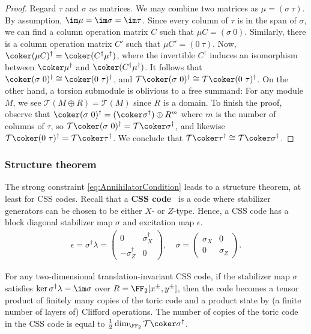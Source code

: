 \begin{proof}
Regard $\tau$ and $\sigma$ as matrices.
We may combine two matrices as $\mu = (\sigma~\tau)$.
By assumption, $\im \mu = \im \sigma = \im \tau$.
Since every column of $\tau$ is in the span of $\sigma$,
we can find a column operation matrix $C$ such that
$\mu C = (\sigma ~ 0)$.
Similarly, there is a column operation matrix $C'$ such that
$\mu C' = (0~\tau)$.
Now, $\coker (\mu C)^\dagger = \coker (C^\dagger \mu^\dagger)$,
where the invertible $C^\dagger$ induces an isomorphism between
$\coker \mu^\dagger$ and $\coker (C^\dagger \mu^\dagger)$.
It follows that $\coker (\sigma~0)^\dagger \cong \coker (0~\tau)^\dagger$,
and $\mathcal T \coker (\sigma~0)^\dagger \cong \mathcal T \coker (0~\tau)^\dagger$.
On the other hand,
a torsion submodule is oblivious to a free summand:
For any module $M$, we see $\mathcal T(M \oplus R) = \mathcal T(M)$
since $R$ is a domain.
To finish the proof, observe that 
$\coker (\sigma~0)^\dagger = (\coker \sigma^\dagger) \oplus R^m$
where $m$ is the number of columns of $\tau$,
so $\mathcal T \coker (\sigma~0)^\dagger = \mathcal T \coker \sigma^\dagger$,
and likewise $\mathcal T \coker (0~\tau)^\dagger = \mathcal T \coker \tau^\dagger$.
We conclude that $\mathcal T \coker \tau^\dagger \cong \mathcal T \coker \sigma^\dagger$.
\end{proof}

\subsubsection{Structure theorem}

The strong constraint \eqref{eq:AnnihilatorCondition}
leads to a structure theorem, at least for CSS codes.
Recall that a {\bf CSS code}~\cite{CalderbankShor1996Good,Steane1996Multiple}
is a code where stabilizer generators
can be chosen to be either $X$- or $Z$-type.
Hence, a CSS code has a block diagonal stabilizer map $\sigma$
and excitation map $\epsilon$.
\begin{align}
\epsilon = \sigma^\dagger \lambda = \begin{pmatrix}
0 & \sigma_X^\dagger \\ -\sigma_Z^\dagger & 0
\end{pmatrix}, \quad
\sigma = \begin{pmatrix}
\sigma_X & 0 \\ 0 & \sigma_Z 
\end{pmatrix}.
\end{align}
\begin{thm}
For any two-dimensional translation-invariant CSS code,
if the stabilizer map $\sigma$ satisfies
$\ker \sigma^\dagger \lambda = \im \sigma$ over $R = \FF_2[x^\pm, y^\pm]$,
then the code becomes a tensor product of finitely many copies of the toric code
and a product state by (a finite number of layers of) Clifford operations.
The number of copies of the toric code in the CSS code is equal to 
$\frac 12 \dim_{\FF_2} \mathcal T \coker \sigma^\dagger$.
\label{CSS2dClassification}
\end{thm}

